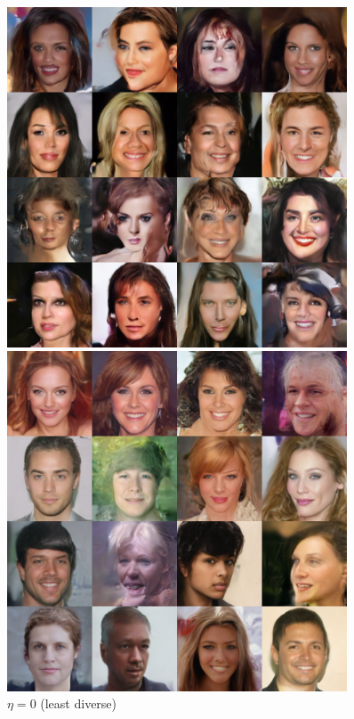 \documentclass[conference]{IEEEtran}
\begin{document}
\begin{figure}[H]
    \begin{minipage}{0.25\textwidth}
        \centering
        \includegraphics[width=0.9\textwidth]{figures/eta0.png}
        \caption{$\eta = 0$ (least diverse)} \label{fig:eta0}
    \end{minipage}\hfill
    \begin{minipage}{0.25\textwidth}
        \centering
        \includegraphics[width=0.9\textwidth]{figures/eta25.png}

\end{minipage}
\end{figure}
\end{document}

